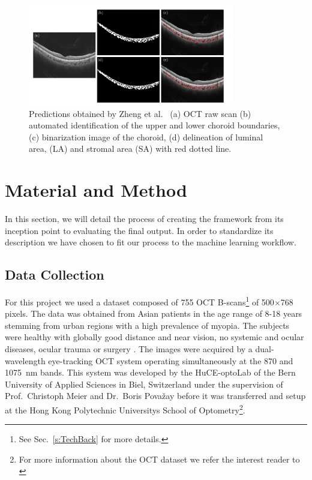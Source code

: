 \documentclass[12pt,a4paper]{scrartcl}
\begin{document}
\begin{figure}[H]
    \centering
    \includegraphics[width=0.8\textwidth]{./images/choroidal-segmentation-zheng.png}
    \caption{Predictions obtained by Zheng et al.~\cite{Zheng2020} (a) OCT raw scan (b) automated identification of the upper and lower choroid boundaries, (c) binarization image of the choroid,  (d) delineation  of luminal area, (LA) and stromal area (SA) with red dotted line.}
\end{figure}





\section{Material and Method}\label{s:MaterialMethod}

In this section, we will detail the process of creating the framework from its inception point to evaluating the final output. In order to standardize its description we have chosen to fit our process to the machine learning workflow. 

\subsection{Data Collection}\label{ss:data_collection}
For this project we used a dataset composed of 755 OCT B-scans\footnote{See Sec.~\ref{s:TechBack} for more details.} of 500$\times$768 pixels. The data was obtained from Asian patients in the age range of 8-18 years stemming from urban regions with a high prevalence of myopia. The subjects were healthy with globally good distance and near vision, no systemic and ocular diseases, ocular trauma or surgery \cite{Ronchetti2019}. The images were acquired by a dual-wavelength eye-tracking OCT system operating simultaneously at the 870 and \SI{1075}{\nano\metre} bands. This system was developed by the HuCE-optoLab of the Bern University of Applied Sciences in Biel, Switzerland under the supervision of Prof.~Christoph Meier and Dr.~Boris Pova\v{z}ay\cite{Ronchetti2019}  before it was transferred and setup at the Hong Kong Polytechnic University\textquotesingle s School of Optometry\footnote{For more information about the OCT dataset we refer the interest reader to \cite{Ronchetti2019}}.
\end{document}
